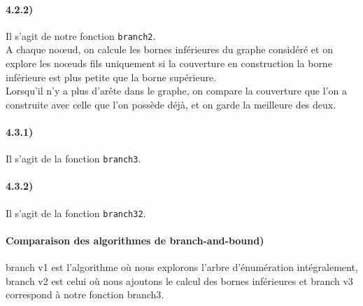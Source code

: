 \documentclass[12pt]{article}
\begin{document}
    \paragraph{4.2.2)}
        Il s'agit de notre fonction \texttt{branch2}. \\
        A chaque noœud, on calcule les bornes inférieures du graphe considéré et on explore les noœuds fils uniquement si la couverture en construction la borne inférieure est plus petite que la borne supérieure. \\
        Lorsqu'il n'y a plus d'arête dans le graphe, on compare la couverture que l'on a construite avec celle que l'on possède déjà, et on garde la meilleure des deux.
    
    \paragraph{4.3.1)}
        Il s'agit de la fonction \texttt{branch3}.

    \paragraph{4.3.2)}
        Il s'agit de la fonction \texttt{branch32}.

    \paragraph{Comparaison des algorithmes de branch-and-bound)}
        branch v1 est l'algorithme où nous explorons l'arbre d'énumération intégralement, branch v2 est celui où nous ajoutons le calcul des bornes inférieures et branch v3 correspond à notre fonction branch3.
\end{document}
